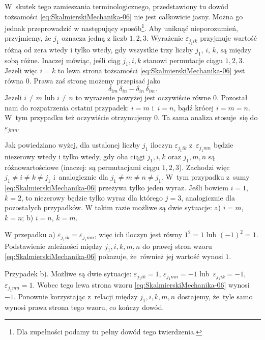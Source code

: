 \documentclass[a4paper,11pt]{article}
\numberwithin{equation}{section}
\begin{document}
W~skutek tego zamieszania terminologicznego, przedstawiony tu dowód
tożsamości \eqref{eq:SkalmierskiMechanika-06} nie jest całkowicie jasny.
Można go jednak przeprowadzić w następujący sposób\footnote{Dla zupełności
  podamy tu pełny dowód tego twierdzenia.}. Aby uniknąć nieporozumień,
przyjmiemy, że $j_{ 1 }$ oznacza jedną z liczb $1, 2, 3$. Wyrażenie
$\varepsilon_{ j_{ 1 } i k }$ przyjmuje wartość różną od zera wtedy i tylko wtedy, gdy
wszystkie trzy liczby $j_{ 1 }$, $i$, $k$, są między sobą różne. Inaczej
mówiąc, jeśli ciąg $j_{ 1 }, i, k$ stanowi permutacje ciągu $1, 2, 3$.
Jeżeli więc $i = k$ to lewa strona tożsamości
\eqref{eq:SkalmierskiMechanika-06} jest równa 0.
Prawa zaś stronę możemy przepisać jako
\begin{equation}
  \label{eq:SkalmierskiMechanika-07}
  \delta_{ i m } \, \delta_{ i n } - \delta_{ i n } \, \delta_{ i m }.
\end{equation}
Jeżeli $i \neq m$ lub $i \neq n$ to wyrażenie powyżej jest oczywiście równe 0.
Pozostał nam do rozpatrzenia ostatni przypadek: $i = m$ i~$i = n$, bądź
krócej $i = m = n$. W~tym przypadku też oczywiście otrzymujemy 0. Ta sama
analiza stosuje~się do $\varepsilon_{ j m n }$.

Jak powiedziano wyżej, dla ustalonej liczby $j_{ 1 }$ iloczyn
$\varepsilon_{ j_{ 1 } i k }$ z~$\varepsilon_{ j_{ 1 } m n }$ będzie niezerowy wtedy i tylko wtedy,
gdy oba ciągi $j_{ 1 }, i, k$ oraz $j_{ 1 }, m, n$ są różnowartościowe
(inaczej: są permutacjami ciągu $1, 2, 3$). Zachodzi więc
$j_{ 1 } \neq i \neq k \neq j_{ 1 }$ i~analogicznie dla $j_{ 1 } \neq m \neq n \neq j_{ 1 }$.
W~tym przypadku z~sumy \eqref{eq:SkalmierskiMechanika-06} przeżywa tylko
jeden wyraz. Jeśli bowiem $i = 1$, $k = 2$, to niezerowy będzie tylko wyraz
dla którego $j = 3$, analogicznie dla pozostałych przypadków. W takim razie
możliwe są dwie sytuacje: a) $i = m$, $k = n$; b) $i = n$, $k = m$.

W przepadku a) $\varepsilon_{ j_{ 1 } i k } = \varepsilon_{ j_{ 1 } m n }$, więc ich iloczyn jest
równy $1^{ 2 } = 1$ lub $( -1 )^{ 2 } = 1$. Podstawienie zależności między
$j_{ 1 }, i, k, m, n$ do prawej stron wzoru
\eqref{eq:SkalmierskiMechanika-06} pokazuje, że~również jej wartość wynosi
$1$.

Przypadek b). Możliwe są dwie sytuacje:
$\varepsilon_{ j_{ 1 } i k } = 1$, $\varepsilon_{ j_{ 1 } m n } = -1$
lub~$\varepsilon_{ j_{ 1 } i k } = -1$, $\varepsilon_{ j_{ 1 } m n } = 1$. Wobec tego lewa strona wzoru
\eqref{eq:SkalmierskiMechanika-06} wynosi $-1$. Ponownie korzystając
z~relacji między $j_{ 1 }, i, k, m, n$ dostajemy, że~tyle samo wynosi prawa
strona tego wzoru, co kończy dowód.
\end{document}

